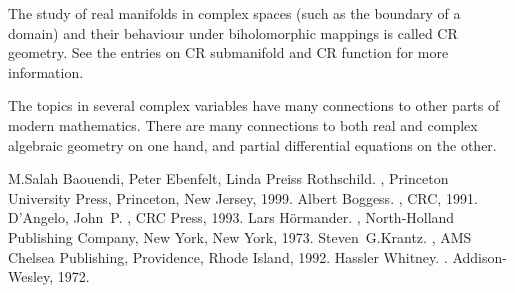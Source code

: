 \documentclass[12pt]{article}
\theoremstyle{theorem}
\theoremstyle{definition}
\theoremstyle{remark}
\begin{document}
The study of real manifolds in complex spaces (such as the boundary of a domain) and their behaviour under biholomorphic mappings is called CR geometry.  See the entries on CR submanifold and CR function for more information.

The topics in several complex variables have many connections to other parts of modern mathematics.  There are many connections to both real and complex
algebraic geometry on one hand, and partial differential equations on the other.

\begin{thebibliography}{9}
M.\@ Salah Baouendi,
Peter Ebenfelt,
Linda Preiss Rothschild.
{\em {}},
Princeton University Press,
Princeton, New Jersey, 1999.
Albert Boggess.
{\em {}},
CRC, 1991.
D'Angelo, John~P.
{\em {}},
CRC Press, 1993.
Lars H\"ormander.
{\em {}},
North-Holland Publishing Company, New York, New York, 1973.
Steven~G.\@ Krantz.
{\em {}},
AMS Chelsea Publishing, Providence, Rhode Island, 1992.
Hassler Whitney.
{\em {}}.
Addison-Wesley, 1972.
\end{thebibliography}
\end{document}
